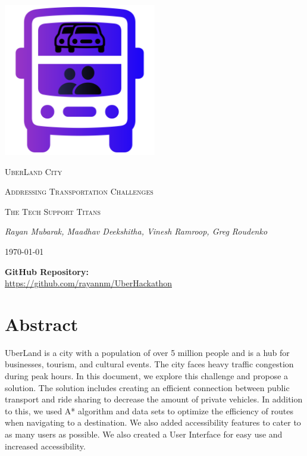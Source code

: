 \documentclass{article}
\begin{document}
\begin{titlepage}
    \centering
    \includegraphics[width=0.5\textwidth]{logo.png}\par\vspace{1cm}
    {\scshape\LARGE UberLand City \par}
    \vspace{1cm}
    {\scshape\Large Addressing Transportation Challenges \par}
    \vspace{2cm}
    {\scshape\LARGE The Tech Support Titans\par}
    \vspace{.6cm}
    {\itshape\LARGE Rayan Mubarak,  Maadhav Deekshitha, Vinesh Ramroop, Greg Roudenko\par}
    \vfill
    {\large \today\par}

\Large\textbf{GitHub Repository:} \\
    \Large\url{https://github.com/rayannm/UberHackathon}
\end{titlepage}


\tableofcontents


\section{Abstract}


UberLand is a city with a population of over 5 million people and is a hub for businesses, tourism, and cultural events. The city faces heavy traffic congestion during peak hours. In this document, we explore this challenge and propose a solution. The solution includes creating an efficient connection between public transport and ride sharing to decrease the amount of private vehicles. In addition to this, we used A* algorithm and data sets to optimize the efficiency of routes when navigating to a destination. We also added accessibility features to cater to as many users as possible. We also created a User Interface for easy use and increased accessibility.
\end{document}
